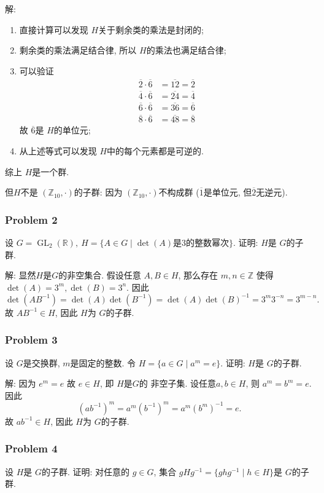 \documentclass[a4paper,12pt]{ctexart}
\newcommand{\Z}{\mathbb{Z}}
\newcommand{\R}{\mathbb{R}}
\begin{document}
  解: \begin{enumerate}[label=(\arabic{*})]
    \item 直接计算可以发现 $ H $关于剩余类的乘法是封闭的;
    \item 剩余类的乘法满足结合律, 所以 $ H $的乘法也满足结合律;
    \item 可以验证 
    \begin{align*}
      \overline{2}\cdot\overline{6}&=\overline{12}=\overline{2}\\
      \overline{4}\cdot\overline{6}&=\overline{24}=\overline{4}\\ 
      \overline{6}\cdot\overline{6}&=\overline{36}=\overline{6}\\ 
      \overline{8}\cdot\overline{6}&=\overline{48}=\overline{8} 
    \end{align*}
    故 $ \overline{6} $是 $ H $的单位元;
    \item 从上述等式可以发现 $ H $中的每个元素都是可逆的.
  \end{enumerate}
    综上 $ H $是一个群.
    
    但$ H $不是 $ (\Z_{10},\cdot) $的子群: 因为 $ (\Z_{10},\cdot) $不构成群 ($\overline{1}$是单位元, 但$\overline{2}$无逆元).

\subsubsection*{Problem 2} 
  设 $ G=\operatorname{GL}_2(\R),~H=\{A\in G\mid\det(A)\text{是3的整数幂次}\} $. 证明: $ H $是 $ G $的子群.
  
  解: 显然$ H $是$G$的非空集合. 假设任意 $ A,B\in H $, 那么存在 $ m,n\in\Z $ 使得 $ \det(A)=3^m,\det(B)=3^n $. 因此
  \[\det(AB^{-1})=\det(A)\det(B^{-1})=\det(A)\det(B)^{-1}=3^m3^{-n}=3^{m-n}.\]
  故 $ AB^{-1}\in H $, 因此 $ H $为 $ G $的子群.

\subsubsection*{Problem 3}
  设 $ G $是交换群, $ m $是固定的整数. 令 $ H=\{a\in G\mid a^m=e\} $. 证明: $ H $是 $ G $的子群.    

  解: 因为 $ e^m=e $ 故 $ e\in H $, 即 $ H $是$G$的 非空子集. 设任意$ a,b\in H $, 则 $ a^m=b^m=e $. 因此
  \[(ab^{-1})^m=a^m(b^{-1})^m=a^m(b^m)^{-1}=e.\]
  故 $ ab^{-1}\in H $, 因此 $ H $为 $ G $的子群.

\subsubsection*{Problem 4}
  设 $ H $是 $ G $的子群. 证明: 对任意的 $ g\in G $, 集合 $ gHg^{-1}=\{ghg^{-1}\mid h\in H\} $是 $ G $的子群.
\end{document}
